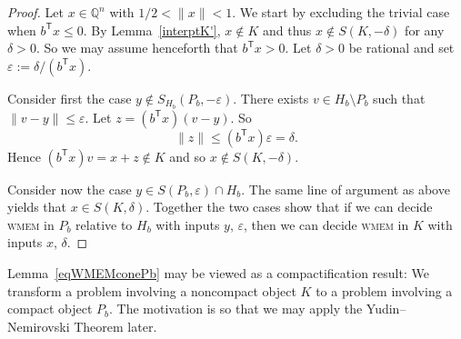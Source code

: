 \documentclass[11pt,reqno]{amsart}
\theoremstyle{definition}
\theoremstyle{remark}
\begin{document}
\begin{proof}
Let $x\in \mathbb{Q}^n$ with $1/2 <\|x\|<1$. We start by excluding the trivial case when $b^\mathsf{T} x\le 0$.  By Lemma~\ref{interptK'},  $x\notin K$ and thus $x\notin S(K,-\delta)$ for any $\delta >0$. So we may assume henceforth that $b^\mathsf{T} x> 0$. Let $\delta > 0$ be rational  and set $\varepsilon:=\delta/(b^\mathsf{T} x)$.

Consider first the case $y\notin S_{H_b}(P_b,-\varepsilon)$.  There exists $v\in H_b\setminus{P_b}$ such that $\|v-y\|\le \varepsilon$.  Let $z=(b^\mathsf{T} x)(v-y)$.  So
\[
\|z\|\le (b^\mathsf{T} x)\varepsilon =\delta.
\]
Hence $(b^\mathsf{T} x)v=x+z\notin K$ and so $x\notin S(K,-\delta)$.  

Consider now the case $y\in S(P_b,\varepsilon) \cap H_b$. The same line of argument as above yields  that  $x\in S(K,\delta)$.  Together the two cases show that if we can decide \textsc{wmem} in $P_b$ relative to $H_b$ with inputs $y$, $\varepsilon$, then we can decide \textsc{wmem} in $K$ with inputs $x$, $\delta$.
\end{proof}

Lemma~\ref{eqWMEMconePb} may be viewed as a compactification result: We transform a problem involving a noncompact object $K$ to a problem involving a compact object $P_b$. The motivation is so that we may apply the Yudin--Nemirovski Theorem later. 
\end{document}
